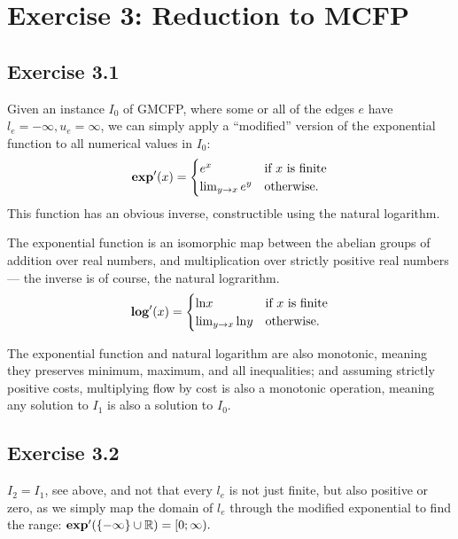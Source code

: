 \section{Exercise 3: Reduction to MCFP}

\subsection{Exercise 3.1}

Given an instance $I_0$ of GMCFP, where some or
all of the edges $e$ have $l_e = -\infty, u_e = \infty$, we can
simply apply a ``modified'' version of the exponential function to
all numerical values in $I_0$:
\begin{align}
  \bm{\mathrm{exp}}'(x) = \begin{cases}
    e^x & \text{if $x$ is finite} \\
    \lim_{y\to x} e^y & \text{otherwise.}
  \end{cases}
\end{align}
This function has an obvious inverse, constructible using the natural logarithm.

The exponential function is an isomorphic map between the abelian groups of addition
over real numbers, and multiplication over strictly positive real numbers --- the inverse
is of course, the natural lograrithm.
\begin{align}
  \bm{\mathrm{log}}'(x) = \begin{cases}
    \mathrm{ln} x & \text{if $x$ is finite} \\
    \lim_{y\to x} \mathrm{ln} y & \text{otherwise.}
  \end{cases}
\end{align}

The exponential function and natural logarithm are also monotonic, meaning they
preserves minimum, maximum, and all inequalities; and assuming strictly positive costs, multiplying
flow by cost is also a monotonic operation, meaning any solution to $I_1$ is also a solution to $I_0$.

\subsection{Exercise 3.2}

$I_2 = I_1$, see above, and not that every $l_e$ is not just finite, but also positive or zero, as
we simply map the domain of $l_e$ through the modified exponential to find the range:
$\bm{\mathrm{exp}}'(\{-\infty\}\cup \mathbb R) = [0;\infty).$

